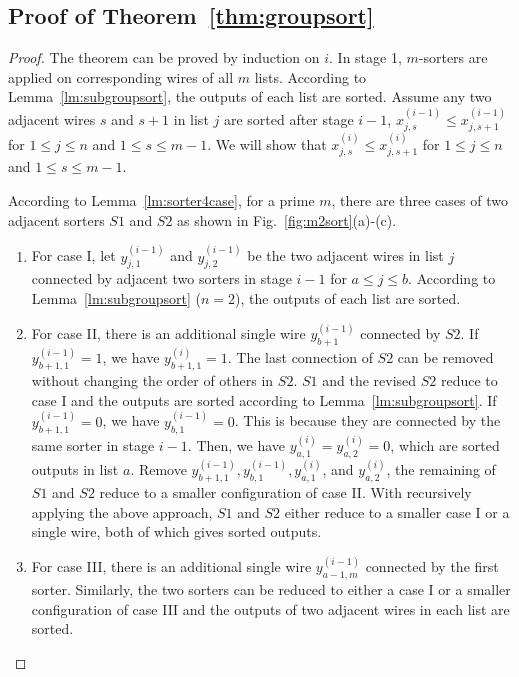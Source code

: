 \documentclass[10pt,journal,cspaper,compsoc]{IEEEtran}
\begin{document}
\subsection{Proof of Theorem~\ref{thm:groupsort}}
\label{pf:groupsort}
\begin{proof}
  The theorem can be proved by induction on $i$.
  In stage 1, $m$-sorters are applied on corresponding wires of all $m$ lists. According to Lemma~\ref{lm:subgroupsort}, the outputs of each list are sorted.
  Assume any two adjacent wires $s$ and $s+1$ in list $j$ are sorted after stage $i-1$, $x^{(i-1)}_{j,s} \le x^{(i-1)}_{j,s+1}$ for $1\le j \le n$ and $1\le s \le m-1$. We will show that $x^{(i)}_{j,s} \le x^{(i)}_{j,s+1}$ for $1\le j \le n$ and $1\le s \le m-1$.

  According to Lemma~\ref{lm:sorter4case}, for a prime $m$, there are three cases of two adjacent sorters $S1$ and $S2$ as shown in Fig.~\ref{fig:m2sort}(a)-(c).
  \begin{enumerate}
    \item For case I, let $y^{(i-1)}_{j,1}$ and $y^{(i-1)}_{j,2}$ be the two adjacent wires in list $j$ connected by adjacent two sorters in stage $i-1$ for $a\le j \le b$. According to Lemma~\ref{lm:subgroupsort} ($n=2$), the outputs of each list are sorted.
    \item For case II, there is an additional single wire $y^{(i-1)}_{b+1}$ connected by $S2$. If $y^{(i-1)}_{b+1,1}=1$, we have $y^{(i)}_{b+1,1}=1$. The last connection of $S2$ can be removed without changing the order of others in $S2$.
        $S1$ and the revised $S2$ reduce to case I and the outputs are sorted according to Lemma~\ref{lm:subgroupsort}. If $y^{(i-1)}_{b+1,1}=0$, we have $y^{(i-1)}_{b,1}=0$. This is because they are connected by the same sorter in stage $i-1$. Then, we have $y^{(i)}_{a,1}=y^{(i)}_{a,2}=0$, which are sorted outputs in list $a$. Remove $y^{(i-1)}_{b+1,1}, y^{(i-1)}_{b,1}, y^{(i)}_{a,1}$, and $y^{(i)}_{a,2}$, the remaining of $S1$ and $S2$ reduce to a smaller configuration of case II. With recursively applying the above approach, $S1$ and $S2$ either reduce to a smaller case I or a single wire, both of which gives sorted outputs.
    \item For case III, there is an additional single wire $y^{(i-1)}_{a-1,m}$ connected by the first sorter. Similarly, the two sorters can be reduced to either a case I or a smaller configuration of case III and the outputs of two adjacent wires in each list are sorted.
  \end{enumerate}

\end{proof}
\end{document}
